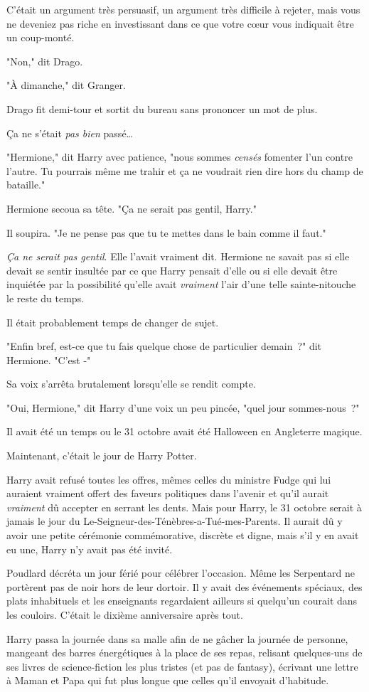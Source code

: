 C'était un argument très persuasif, un argument très difficile à rejeter, mais vous ne deveniez pas riche en investissant dans ce que votre cœur vous indiquait être un coup-monté.

"Non," dit Drago.

"À dimanche," dit Granger.

Drago fit demi-tour et sortit du bureau sans prononcer un mot de plus.

Ça ne s'était \emph{pas bien} passé…

\later

"Hermione," dit Harry avec patience, "nous sommes \emph{censés} fomenter l'un contre l'autre. Tu pourrais même me trahir et ça ne voudrait rien dire hors du champ de bataille."

Hermione secoua sa tête. "Ça ne serait pas gentil, Harry."

Il soupira. "Je ne pense pas que tu te mettes dans le bain comme il faut."

\emph{Ça ne serait pas gentil}. Elle l'avait vraiment dit. Hermione ne savait pas si elle devait se sentir insultée par ce que Harry pensait d'elle ou si elle devait être inquiétée par la possibilité qu'elle avait \emph{vraiment} l'air d'une telle sainte-nitouche le reste du temps.

Il était probablement temps de changer de sujet.

"Enfin bref, est-ce que tu fais quelque chose de particulier demain~?" dit Hermione. "C'est -"

Sa voix s'arrêta brutalement lorsqu'elle se rendit compte.

"Oui, Hermione," dit Harry d'une voix un peu pincée, "quel jour sommes-nous~?"


Il avait été un temps ou le 31 octobre avait été Halloween en Angleterre magique.

Maintenant, c'était le jour de Harry Potter.

Harry avait refusé toutes les offres, mêmes celles du ministre Fudge qui lui auraient vraiment offert des faveurs politiques dans l'avenir et qu'il aurait \emph{vraiment} dû accepter en serrant les dents. Mais pour Harry, le 31 octobre serait à jamais le jour du Le-Seigneur-des-Ténèbres-a-Tué-mes-Parents. Il aurait dû y avoir une petite cérémonie commémorative, discrète et digne, mais s'il y en avait eu une, Harry n'y avait pas été invité.

Poudlard décréta un jour férié pour célébrer l'occasion. Même les Serpentard ne portèrent pas de noir hors de leur dortoir. Il y avait des événements spéciaux, des plats inhabituels et les enseignants regardaient ailleurs si quelqu'un courait dans les couloirs. C'était le dixième anniversaire après tout.

Harry passa la journée dans sa malle afin de ne gâcher la journée de personne, mangeant des barres énergétiques à la place de ses repas, relisant quelques-uns de ses livres de science-fiction les plus tristes (et pas de fantasy), écrivant une lettre à Maman et Papa qui fut plus longue que celles qu'il envoyait d'habitude.

